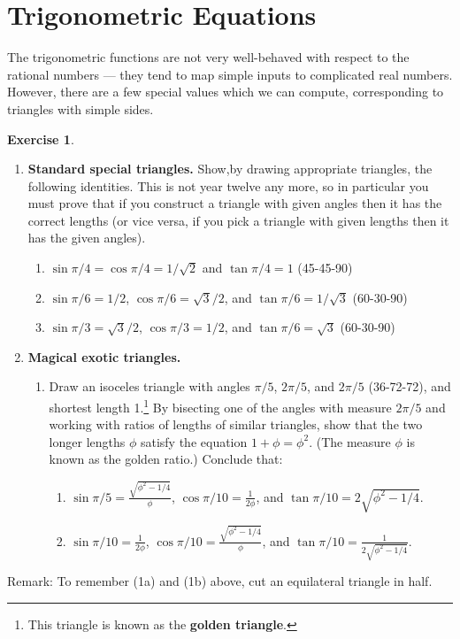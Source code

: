 \documentclass[a4paper,leqno]{article}
\newcommand{\marginsymbol}{\marginpar{\hfill(\ding{43})}}
\numberwithin{equation}{section}
\theoremstyle{definition}
\newtheorem{exercise}[equation]{Exercise}
\theoremstyle{remark}
\newcommand{\df}[1]{\textbf{#1}}
\begin{document}
\section{Trigonometric Equations}
The trigonometric functions are not very well-behaved with respect to the rational numbers --- they tend to map
simple inputs to complicated real numbers. However, there are a few special values which we can compute, corresponding
to triangles with simple sides.
\begin{exercise}\leavevmode\label{ex:specialtriangles}
  \begin{enumerate}
    \item \textbf{Standard special triangles.} Show,\marginsymbol by drawing appropriate triangles, the following identities. This is not year twelve any more,
                                               so in particular you must prove that if you construct a triangle with given angles then it has the
                                               correct lengths (or vice versa, if you pick a triangle with given lengths then it has the given angles).
      \begin{enumerate}
        \item $ \sin \pi/4 = \cos \pi/4 = 1/\sqrt{2} $ and $ \tan \pi/4 = 1 $ (45-45-90)
        \item $ \sin \pi/6 = 1/2 $, $ \cos \pi/6 = \sqrt{3}/2 $, and $ \tan \pi/6 = 1/\sqrt{3} $ (60-30-90)
        \item $ \sin \pi/3 = \sqrt{3}/2 $, $ \cos \pi/3 = 1/2 $, and $ \tan \pi/6 = \sqrt{3} $ (60-30-90)
      \end{enumerate}
    \item \textbf{Magical exotic triangles.}
      \begin{enumerate}
        \item Draw an isoceles triangle with angles $ \pi/5 $, $ 2\pi/5 $, and $ 2\pi/5 $ (36-72-72), and shortest length 1.\footnote{This
              triangle is known as the \df{golden triangle}.} By bisecting one of the angles with measure $ 2\pi/5 $ and working with ratios
              of lengths of similar triangles, show that the two longer lengths $ \phi $ satisfy the equation $ 1 + \phi = \phi^2 $. (The
              measure $ \phi $ is known as the golden ratio.) Conclude that:
              \begin{enumerate}
                \item $ \sin \pi/5 = \frac{\sqrt{\phi^2 - 1/4}}{\phi} $, $ \cos \pi/10 = \frac{1}{2\phi} $, and $ \tan \pi/10 = 2\sqrt{\phi^2 - 1/4} $.
                \item $ \sin \pi/10 = \frac{1}{2\phi} $, $ \cos \pi/10 = \frac{\sqrt{\phi^2 - 1/4}}{\phi} $, and $ \tan \pi/10 = \frac{1}{2\sqrt{\phi^2 - 1/4}} $.
              \end{enumerate}
      \end{enumerate}
  \end{enumerate}
  Remark: To remember (1a) and (1b) above, cut an equilateral triangle in half.
\end{exercise}
\end{document}

